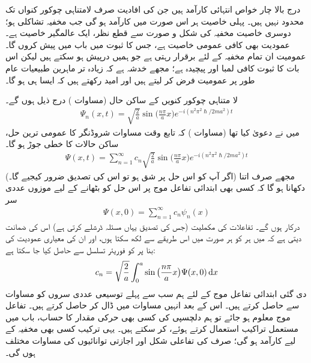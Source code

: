 درج بالا چار خواص انتہائی کارآمد ہیں جن کی افادیت صرف لامتناہی چوکور کنواں تک محدود نہیں ہیں۔ پہلی خاصیت ہر اس صورت میں کارآمد ہو گی جب مخفیہ تشاکلی ہو؛ دوسری خاصیت مخفیہ کی شکل و صورت سے قطع نظر، ایک عالمگیر خاصیت ہے۔ عمودیت بھی کافی عمومی خاصیت ہے، جس کا ثبوت میں باب  میں پیش کروں گا۔ عمومیت ان تمام مخفیہ کے لئے برقرار رہتی ہے جو ہمیں درپیش ہو سکتے ہیں لیکن اس بات کا ثبوت کافی لمبا اور پیچیدہ ہے؛ مجھے خدشہ ہے کہ زیادہ تر ماہرین طبیعیات عام طور پر عمومیت فرض کر لیتے ہیں اور امید رکھتے ہیں کہ ایسا ہی ہو گا۔

 لا متناہی چوکور کنویں کے ساکن حال (مساوات ) درج ذیل ہوں گے۔ 
 \begin{align}
\Psi_{n}(x,t)=\sqrt{\frac{2}{a}}\sin\big(\frac{n\pi}{a}x\big)e^{-i(n^{2}\pi^{2}\hslash/2ma^{2})t}
\end{align}
 میں نے دعویٰ کیا تھا (مساوات ) کہ تابع وقت مساوات شروڈنگر کا عمومی ترین حل، ساکن حالات کا خطی جوڑ ہو گا۔
\begin{align}\label{مساوات_شروڈنگر_ساکن_حالات_کا_مجموعہ}
\Psi(x,t)=\sum_{n=1}^{\infty}c_n\sqrt{\frac{2}{a}}\sin\big(\frac{n\pi}{a}x\big)e^{-i(n^{2}\pi^{2}\hslash/2ma^{2})t}
\end{align} 
 (اگر آپ کو اس حل پر شق ہو تو اس کی تصدیق ضرور کیجیے گا۔) مجھے صرف اتنا دکھانا ہو گا کہ کسی بھی ابتدائی تفاعل موج  پر اس حل کو بٹھانے کے لیے موزوں عددی سر 
\begin{align*}
\Psi(x,0)=\sum_{n=1}^{\infty}c_{n}\psi_{n}(x)
\end{align*}
 درکار ہوں گے۔ تفاعلات  کی مکملیت (جس کی تصدیق یہاں مسئلہ ڈرشلے کرتی ہے) اس کی ضمانت دیتی ہے کہ میں ہر  کو ہر صورت میں اس طریقے سے لکھ سکتا ہوں، اور ان کی معیاری عمودیت کی بنا پر  کو فوریئر تسلسل سے حاصل کیا جا سکتا ہے: 
\begin{align}\label{مساوات_شروڈنگر_عددی_سروں}
c_{n}=\sqrt{\frac{2}{a}}\int_{0}^{a}\sin\big(\frac{n\pi}{a}x\big)\Psi(x,0)\dif{x}
\end{align}
 دی گئی ابتدائی تفاعل موج  کے لئے ہم سب سے پہلے توسیعی عددی سروں  کو مساوات  سے حاصل کرتے ہیں۔ اس کے بعد انہیں مساوات  میں ڈال کر  حاصل کرتے ہیں۔ تفاعل موج معلوم ہو جائے تو ہم دلچسپی کی کسی بھی حرکی مقدار کا حساب، باب  میں مستعمل تراکیب استعمال کرتے ہوئے، کر سکتے ہیں۔ یہی ترکیب کسی بھی مخفیہ کے لیے کارآمد ہو گی؛ صرف  کی تفاعلی شکل اور اجازتی توانائیوں کی مساوات مختلف ہوں گی۔

